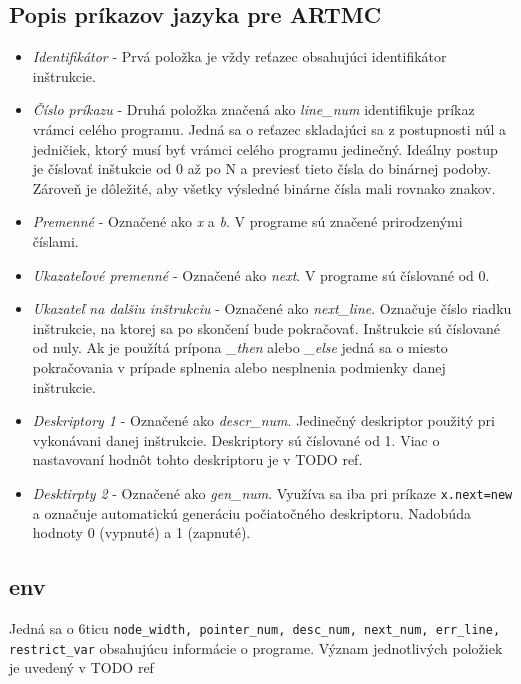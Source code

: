 \subsection{Popis príkazov jazyka pre ARTMC}
\begin{itemize}
    \item \textit{Identifikátor} - Prvá položka je vždy reťazec obsahujúci identifikátor inštrukcie.
    \item \textit{Číslo príkazu} - Druhá položka značená ako \textit{line\_num} identifikuje príkaz
        vrámci celého programu. Jedná sa o reťazec skladajúci sa z postupnosti
        núl a jedničiek, ktorý musí byť vrámci celého  programu jedinečný.
        Ideálny postup je číslovať inštukcie od 0 až po N a previesť tieto
        čísla do binárnej podoby. Zároveň je dôležité, aby všetky výsledné binárne čísla mali rovnako znakov.
    \item \textit{Premenné} - Označené ako \textit{x} a \textit{b}. V programe sú značené prirodzenými číslami.
    \item \textit{Ukazateľové premenné} - Označené ako \textit{next}. V programe sú číslované od 0.
    \item \textit{Ukazateľ na dalšiu inštrukciu} - Označené ako \textit{next\_line}. Označuje
        číslo riadku inštrukcie, na ktorej sa po skončení bude pokračovať. Inštrukcie
        sú číslované od nuly. Ak je použítá prípona \textit{\_then} alebo \textit{\_else}
        jedná sa o miesto pokračovania v prípade splnenia alebo nesplnenia podmienky danej inštrukcie.
    \item \textit{Deskriptory 1} - Označené ako \textit{descr\_num}. Jedinečný deskriptor použitý pri vykonávani danej inštrukcie. Deskriptory sú číslované od 1. Viac o nastavovaní hodnôt tohto deskriptoru je v TODO ref.
    \item \textit{Desktirpty 2} - Označené ako \textit{gen\_num}. Využíva sa iba pri príkaze \texttt{x.next=new} a označuje automatickú generáciu počiatočného deskriptoru. Nadobúda hodnoty 0 (vypnuté) a 1 (zapnuté).
\end{itemize}

\subsection{env}
Jedná sa o 6ticu \texttt{node\_width, pointer\_num, desc\_num, next\_num, err\_line, restrict\_var} obsahujúcu informácie o programe.
Význam jednotlivých položiek je uvedený v TODO ref

